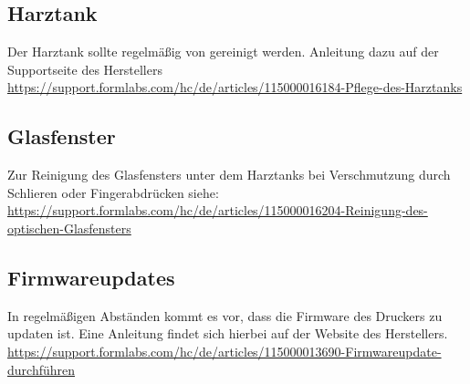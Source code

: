 \documentclass{\basedir/fablab-document}
\begin{document}
	\subsection{Harztank}
		Der Harztank sollte regelmäßig von gereinigt werden. Anleitung dazu auf der Supportseite des Herstellers\\
		\url{https://support.formlabs.com/hc/de/articles/115000016184-Pflege-des-Harztanks}
		
		\subsection{Glasfenster}
		Zur Reinigung des Glasfensters unter dem Harztanks bei Verschmutzung durch Schlieren oder Fingerabdrücken siehe:\\ \url{https://support.formlabs.com/hc/de/articles/115000016204-Reinigung-des-optischen-Glasfensters}
	
	\subsection{Firmwareupdates}
	
In regelmäßigen Abständen kommt es vor, dass die Firmware des Druckers zu updaten ist. Eine Anleitung findet sich hierbei auf der Website des Herstellers.\\	
		\url{https://support.formlabs.com/hc/de/articles/115000013690-Firmwareupdate-durchführen}
	
\end{document}
